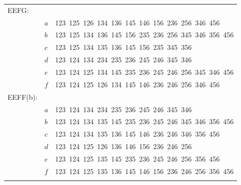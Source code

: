 \documentclass[11pt,a4paper]{amsart}
\theoremstyle{plain}
\theoremstyle{definition}
\begin{document}
\begin{table}
\begin{tabular}{lll}
EEFG:\\
&$a$&123\ 125\ 126\ 134\ 136\ 145\ 146\ 156\ 236\ 256\ 346\ 456\\
&$b$&123\ 125\ 134\ 136\ 145\ 156\ 235\ 236\ 256\ 345\ 346\ 356\ 456\\
&$c$&123\ 125\ 134\ 135\ 136\ 145\ 156\ 235\ 345\ 356\\
&$d$&123\ 124\ 134\ 234\ 235\ 236\ 245\ 246\ 345\ 346\\
&$e$&123\ 124\ 125\ 134\ 145\ 235\ 236\ 245\ 246\ 256\ 345\ 346\ 456\\
&$f$&123\ 124\ 125\ 126\ 134\ 145\ 146\ 236\ 246\ 256\ 346\ 456\\
\addlinespace
% 

%
EEFF(b):\\
&$a$&123\ 124\ 134\ 234\ 235\ 236\ 245\ 246\ 345\ 346\\%
&$b$&123\ 124\ 134\ 135\ 145\ 235\ 236\ 245\ 246\ 345\ 346\ 356\ 456\\
&$c$&123\ 124\ 134\ 135\ 136\ 145\ 146\ 236\ 246\ 346\ 356\ 456\\
&$d$&123\ 124\ 125\ 126\ 136\ 146\ 156\ 236\ 246\ 256\\%
&$e$&123\ 124\ 125\ 135\ 145\ 235\ 236\ 245\ 246\ 256\ 356\ 456\\%
&$f$&123\ 124\ 125\ 135\ 136\ 145\ 146\ 156\ 236\ 246\ 256\ 356\ 456\\
\addlinespace
% 


\end{tabular}
\end{table}
\end{document}
